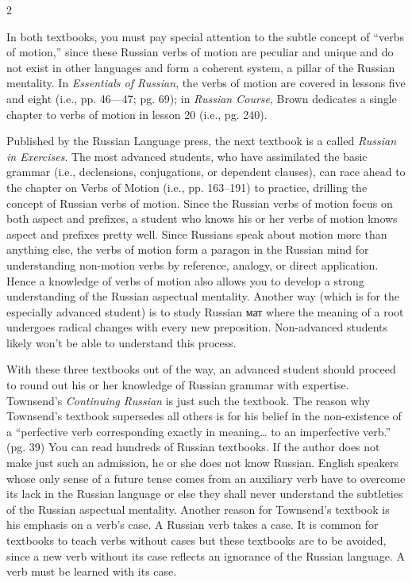 \documentclass[10pt,a4paper,twoside]{article} %
\begin{document}
\begin{multicols}{2}
{\newline \indent In both textbooks, you must pay special attention to the subtle concept of “verbs of motion,” since these Russian verbs of motion are peculiar and unique and do not exist in other languages and form a coherent system, a pillar of the Russian mentality. In \emph{Essentials of Russian}, the verbs of motion are covered in lessons five and eight (i.e., pp. 46—47; pg. 69); in \emph{Russian Course}, Brown dedicates a single chapter to verbs of motion in lesson 20 (i.e., pg. 240). 

\newline \indent Published by the Russian Language press, the next textbook is a called \emph{Russian in Exercises}. The most advanced students, who have assimilated the basic grammar (i.e., declensions, conjugations, or dependent clauses), can race ahead to the chapter on Verbs of Motion (i.e., pp. 163–191) to practice, drilling the concept of Russian verbs of motion. Since the Russian verbs of motion focus on both aspect and prefixes, a student who knows his or her verbs of motion knows aspect and prefixes pretty well. Since Russians speak about motion more than anything else, the verbs of motion form a paragon in the Russian mind for understanding non-motion verbs by reference, analogy, or direct application. Hence a knowledge of verbs of motion also allows you to develop a strong understanding of the Russian aspectual mentality. Another way (which is for the especially advanced student) is to study Russian мат where the meaning of a root undergoes radical changes with every new preposition. Non-advanced students likely won’t be able to understand this process.  

\newline \indent With these three textbooks out of the way, an advanced student should proceed to round out his or her knowledge of Russian grammar with expertise. Townsend’s \emph{Continuing Russian} is just such the textbook. The reason why Townsend’s textbook supersedes all others is for his belief in the non-existence of a “perfective verb corresponding exactly in meaning… to an imperfective verb.” (pg. 39)   You can read hundreds of Russian textbooks. If the author does not make just such an admission, he or she does not know Russian. English speakers whose only sense of a future tense comes from an auxiliary verb have to overcome its lack in the Russian language or else they shall never understand the subtleties of the Russian aspectual mentality. Another reason for Townsend’s textbook is his emphasis on a verb’s case. A Russian verb takes a case. It is common for textbooks to teach verbs without cases but these textbooks are to be avoided, since a new verb without its case reflects an ignorance of the Russian language. A verb must be learned with its case. 

}
\end{multicols}
\end{document}
